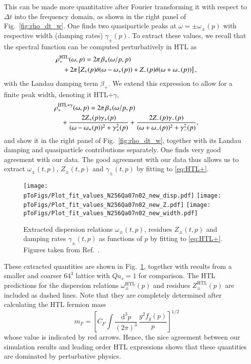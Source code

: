 \documentclass[]{webofc}
\def\be{\begin{equation}}
\def\ee{\end{equation}}
\newcommand{\mrm}{\mathrm}
\newcommand{\HTL}{\mrm{HTL}}
\newcommand{\fig}{Fig.~}
\newcommand{\re}{Ref.~}
\newcommand{\non}{\nonumber \\}
\newcommand{\ud}{\mathrm{d}}
\newcommand{\pToFigs}{.}
\begin{document}
This can be made more quantitative after Fourier transforming it with respect to $\Delta t$ into the frequency domain, as shown in the right panel of \fig\ref{fig:rho_dt_w}. One finds two quasiparticle peaks at $\omega = \pm\omega_\pm(p)$ 
with respective width (damping rates) $\gamma_\pm(p)$. To extract these values, we recall that the spectral function can be computed perturbatively in HTL as \cite{Blaizot:2001nr}
\begin{align} 
 &\rho_{+}^{\rm HTL}(\omega, p)= 2\pi\,\beta_+(\omega/p,p) \non
 & \quad +2\pi \left[ Z_+(p)\delta(\omega - \omega_{+}(p)) + Z_-(p)\delta(\omega + \omega_{-}(p)) \right],
\end{align}
with the Landau damping term $\beta_+$. We extend this expression to allow for a finite peak width, denoting it HTL+$\gamma$,
\begin{align} 
 \label{eq:HTL+}
 &\rho_{+}^{{\rm HTL} + \gamma}(\omega, p)= 2\pi\,\beta_+(\omega/p,p) \\
 & \quad +\frac{2Z_{+}(p) \gamma_{+}(p)}{(\omega-\omega_{+}(p))^2+\gamma_{+}^2(p)} +\frac{2Z_{-}(p) \gamma_{-}(p)}{(\omega+\omega_{-}(p))^2+\gamma_{-}^2(p)}, \nonumber 
\end{align}
and show it in the right panel of \fig\ref{fig:rho_dt_w}, together with its Landau damping and quasiparticle contributions separately. One finds very good agreement with our data. The good agreement with our data thus allows us to extract $\omega_{\pm}(t,p)$, $Z_{\pm}(t,p)$ and $\gamma_{\pm}(t,p)$ by fitting to \eqref{eq:HTL+}. 

\begin{figure}[t!]
 \centering
 \texttt{[image: \\pToFigs/Plot\_fit\_values\_N256Qa07n02\_new\_disp.pdf]}
 \texttt{[image: \\pToFigs/Plot\_fit\_values\_N256Qa07n02\_new\_Z.pdf]}
 \texttt{[image: \\pToFigs/Plot\_fit\_values\_N256Qa07n02\_new\_width.pdf]}
 \caption{Extracted dispersion relations $\omega_{\pm}(t,p)$, residues $Z_{\pm}(t,p)$ and damping rates $\gamma_{\pm}(t,p)$ as functions of $p$ by fitting to \eqref{eq:HTL+}. Figures taken from \re\cite{Boguslavski:2021kdd}.}
 \label{fig:wZg_fits}
\end{figure}

These extracted quantities are shown in \fig\ref{fig:wZg_fits}, together with results from a smaller and coarser $64^3$ lattice with $Q a_s = 1$ for comparison. The HTL predictions for the dispersion relations $\omega_{\pm}^\HTL(p)$ and residues $Z_{\pm}^\HTL(p)$ are included as dashed lines. Note that they are completely determined after calculating the HTL fermion mass 
\be
 m_F = \left[C_F \int \dfrac{\ud^3 p}{(2\pi)^3}\, \dfrac{g^2f_g(p)}{p}\right]^{1/2} 
\ee
whose value is indicated by red arrows. Hence, the nice agreement between our simulation results and leading order HTL expressions shows that these quantities are dominated by perturbative physics.
\end{document}
